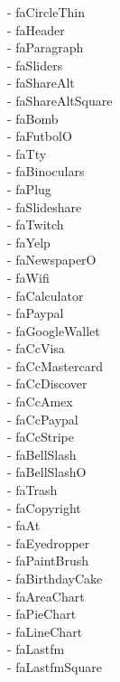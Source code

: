 \documentclass[%
               doublesided,
               paper=a4,
               fontsize=10pt
              ]{my-resume}
\begin{document}
- faCircleThin\\ \faHeader - faHeader\\ \faParagraph - faParagraph\\ \faSliders - faSliders\\ \faShareAlt - faShareAlt\\ \faShareAltSquare - faShareAltSquare\\ \faBomb - faBomb\\ \faFutbolO - faFutbolO\\ \faTty - faTty\\ \faBinoculars - faBinoculars\\ \faPlug - faPlug\\ \faSlideshare - faSlideshare\\ \faTwitch - faTwitch\\ \faYelp - faYelp\\ \faNewspaperO - faNewspaperO\\ \faWifi - faWifi\\ \faCalculator - faCalculator\\ \faPaypal - faPaypal\\ \faGoogleWallet - faGoogleWallet\\ \faCcVisa - faCcVisa\\ \faCcMastercard - faCcMastercard\\ \faCcDiscover - faCcDiscover\\ \faCcAmex - faCcAmex\\ \faCcPaypal - faCcPaypal\\ \faCcStripe - faCcStripe\\ \faBellSlash - faBellSlash\\ \faBellSlashO - faBellSlashO\\ \faTrash - faTrash\\ \faCopyright - faCopyright\\ \faAt - faAt\\ \faEyedropper - faEyedropper\\ \faPaintBrush - faPaintBrush\\ \faBirthdayCake - faBirthdayCake\\ \faAreaChart - faAreaChart\\ \faPieChart - faPieChart\\ \faLineChart - faLineChart\\ \faLastfm - faLastfm\\ \faLastfmSquare - faLastfmSquare\\ 
\end{document}
